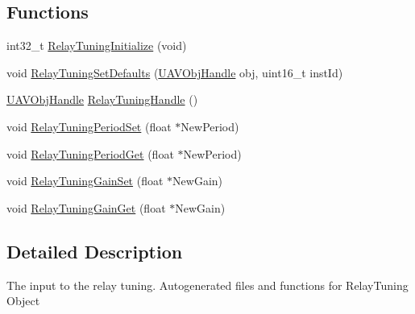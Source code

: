 \subsection*{\-Functions}
\begin{DoxyCompactItemize}
\item 
int32\-\_\-t \hyperlink{group___relay_tuning_ga361d16db30249586aaff3214b6371ff3}{\-Relay\-Tuning\-Initialize} (void)
\item 
void \hyperlink{group___relay_tuning_gaac23022b141f10f05bc734c5fa31f9b5}{\-Relay\-Tuning\-Set\-Defaults} (\hyperlink{targets_2_u_a_v_objects_2inc_2uavobjectmanager_8h_a279053e22be53ce9f895043aaeb91e3b}{\-U\-A\-V\-Obj\-Handle} obj, uint16\-\_\-t inst\-Id)
\item 
\hyperlink{targets_2_u_a_v_objects_2inc_2uavobjectmanager_8h_a279053e22be53ce9f895043aaeb91e3b}{\-U\-A\-V\-Obj\-Handle} \hyperlink{group___relay_tuning_ga24e17a5bf44900b1fcc7be9bbad774b9}{\-Relay\-Tuning\-Handle} ()
\item 
void \hyperlink{group___relay_tuning_ga24f650eeee9d98bb2dc7584a2fd0c16b}{\-Relay\-Tuning\-Period\-Set} (float $\ast$\-New\-Period)
\item 
void \hyperlink{group___relay_tuning_gac232259df7e086374f22c92851ddb894}{\-Relay\-Tuning\-Period\-Get} (float $\ast$\-New\-Period)
\item 
void \hyperlink{group___relay_tuning_gaca4c2504e837b9fb08db0605cb49db36}{\-Relay\-Tuning\-Gain\-Set} (float $\ast$\-New\-Gain)
\item 
void \hyperlink{group___relay_tuning_ga9f63ee147cbcd91bb65af9327ed46b9d}{\-Relay\-Tuning\-Gain\-Get} (float $\ast$\-New\-Gain)
\end{DoxyCompactItemize}


\subsection{\-Detailed \-Description}
\-The input to the relay tuning. \-Autogenerated files and functions for \-Relay\-Tuning \-Object 

